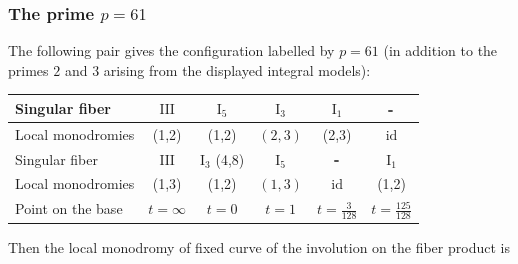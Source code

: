 \documentclass[a4paper]{amsart}
\theoremstyle{plain}
\theoremstyle{definition}
\theoremstyle{remark}
\numberwithin{equation}{section}
\begin{document}
\subsubsection*{The prime $p=61$}
The following pair gives the configuration labelled by $p=61$ (in
addition to the primes $2$ and $3$ arising from the displayed integral
models):
\begin{table}[H]
	\centering
	\renewcommand{\arraystretch}{1.2}
	\begin{tabular}{lccccc}
		\toprule
		Singular fiber
		& $\mathrm{III}$
		& $\mathrm{I}_{5}$
		& $\mathrm{I}_{3}$ & $\mathrm{I}_{1}$ & $\textup{\textbf{-}}$ \\
		\midrule
		Local monodromies &  (1,2)& (1,2)& $(2,3)$ & (2,3)& $\operatorname{id}$\\
		\midrule
		\toprule
		Singular fiber
		& $\mathrm{III}$
		& $\mathrm{I}_{3}$
(4,8)		& $\mathrm{I}_{5}$ & $\textup{\textbf{-}}$ & $\mathrm{I}_{1}$ \\
		\midrule
		Local monodromies &  (1,3)& (1,2)& $(1,3)$ & $\operatorname{id}$ & (1,2)\\
		\midrule
		Point on the base & $t=\infty$ & $t=0$ & $t=1$ & $t=\frac{3}{128}$  & $t=\frac{125}{128}$\\
		\bottomrule
	\end{tabular}

\medskip
	Then the local monodromy of fixed curve of the involution on the fiber product is
	\begin{center}
	\begin{varwidth}{\textheight}
	\end{varwidth}
\end{center}
\end{table}
\end{document}
